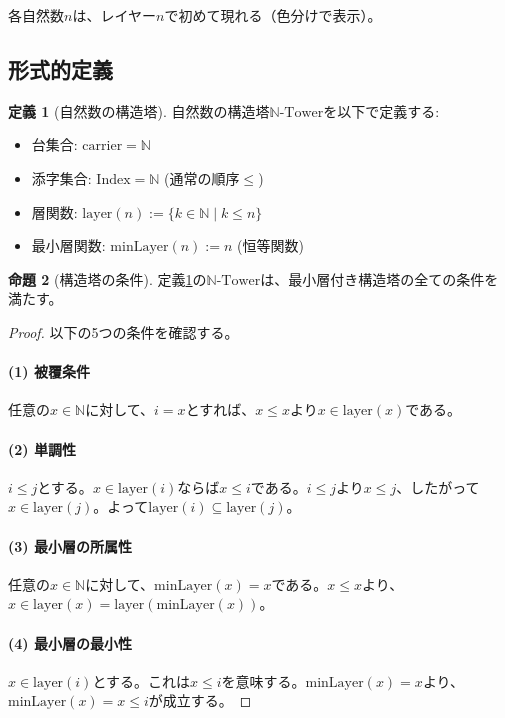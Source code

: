 \documentclass[a4paper,12pt]{article}
\theoremstyle{definition}
\newtheorem{definition}{定義}[section]
\newtheorem{proposition}[definition]{命題}
\begin{document}
各自然数$n$は、レイヤー$n$で初めて現れる（色分けで表示）。

\subsection{形式的定義}

\begin{definition}[自然数の構造塔]\label{def:nat_tower}
自然数の構造塔$\mathbb{N}\text{-Tower}$を以下で定義する:
\begin{itemize}
\item 台集合: $\text{carrier} = \mathbb{N}$
\item 添字集合: $\text{Index} = \mathbb{N}$ (通常の順序$\leq$)
\item 層関数: $\text{layer}(n) := \{k \in \mathbb{N} \mid k \leq n\}$
\item 最小層関数: $\text{minLayer}(n) := n$ (恒等関数)
\end{itemize}
\end{definition}

\begin{proposition}[構造塔の条件]
定義\ref{def:nat_tower}の$\mathbb{N}\text{-Tower}$は、最小層付き構造塔の全ての条件を満たす。
\end{proposition}

\begin{proof}
以下の5つの条件を確認する。

\paragraph{(1) 被覆条件}
任意の$x \in \mathbb{N}$に対して、$i = x$とすれば、$x \leq x$より$x \in \text{layer}(x)$である。

\paragraph{(2) 単調性}
$i \leq j$とする。$x \in \text{layer}(i)$ならば$x \leq i$である。$i \leq j$より$x \leq j$、したがって$x \in \text{layer}(j)$。よって$\text{layer}(i) \subseteq \text{layer}(j)$。

\paragraph{(3) 最小層の所属性}
任意の$x \in \mathbb{N}$に対して、$\text{minLayer}(x) = x$である。$x \leq x$より、$x \in \text{layer}(x) = \text{layer}(\text{minLayer}(x))$。

\paragraph{(4) 最小層の最小性}
$x \in \text{layer}(i)$とする。これは$x \leq i$を意味する。$\text{minLayer}(x) = x$より、$\text{minLayer}(x) = x \leq i$が成立する。
\end{proof}
\end{document}
